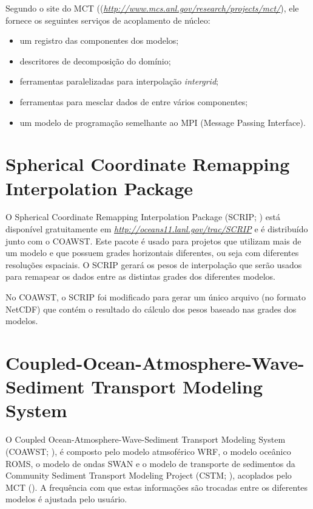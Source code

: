 \noindent Segundo o site do MCT ((\textcolor{bleu_cite}{\href{http://www.mcs.anl.gov/research/projects/mct/}{\textit{http://www.mcs.anl.gov/research/projects/mct/}}}), 
          ele fornece os seguintes serviços de acoplamento de núcleo:
\bigskip

\begin{itemize}
\item um registro das componentes dos modelos;
\item descritores de decomposição do domínio;
\item ferramentas paralelizadas para interpolação \textit{intergrid};
\item ferramentas para mesclar dados de entre vários componentes;
\item um modelo de programação semelhante ao MPI (Message Passing Interface).
\end{itemize}
\bigskip

\section{Spherical Coordinate Remapping Interpolation Package}\label{scripsecao}
\bigskip

\noindent O  Spherical Coordinate Remapping Interpolation Package (SCRIP; \cite{Jones1999,Jones1998}) 
          está disponível gratuitamente em \textcolor{bleu_cite}{\href{http://oceans11.lanl.gov/trac/SCRIP}{\textit{http://oceans11.lanl.gov/trac/SCRIP}}} 
          e é distribuído junto com o COAWST. Este pacote é usado para projetos que utilizam mais de um modelo e que possuem grades 
          horizontais diferentes, ou seja com diferentes resoluções espaciais. O SCRIP gerará os pesos de interpolação que serão 
          usados para remapear os dados entre as distintas grades dos diferentes modelos.
\bigskip

\noindent No COAWST, o SCRIP foi modificado para gerar um único arquivo (no formato NetCDF) que contém o resultado do cálculo 
          dos pesos baseado nas grades dos modelos.

\bigskip

\section{Coupled-Ocean-Atmosphere-Wave-Sediment Transport Modeling System}
\bigskip
\noindent O Coupled Ocean-Atmosphere-Wave-Sediment Transport Modeling System (COAWST; \cite{Warner2010,Warner2008}), 
          é composto pelo modelo atmsoférico WRF, o modelo oceânico ROMS, o modelo de ondas SWAN e o modelo de transporte de sedimentos
          da Community Sediment Transport Modeling Project (CSTM; \cite{Warner2008}), acoplados pelo MCT (\cite{Warner2010,Warner2008}). 
          A frequência com que estas informações são trocadas entre os diferentes modelos é ajustada pelo usuário.
\bigskip

